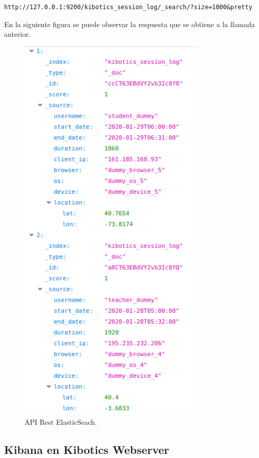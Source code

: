 \documentclass[11pt,a4paper]{book}
\begin{document}
				\begin{Verbatim}[tabsize=4]	
http://127.0.0.1:9200/kibotics_session_log/_search/?size=1000&pretty
				\end{Verbatim}

				En la siguiente figura se puede observar la respuesta que se obtiene a la llamada anterior.
					
				\begin{figure}[H]
					\centering
					\includegraphics[width=9cm, keepaspectratio]{img/api_elasticsearch.png}
					\caption{API Rest ElasticSeach.}
					\label{fig:api_elasticsearch}
				\end{figure}

			\subsection{Kibana en Kibotics Webserver}
				
\end{document}
